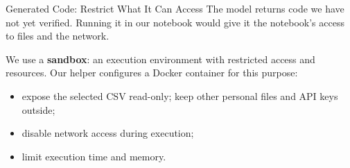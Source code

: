 \documentclass[aspectratio=169]{beamer}
\begin{document}
\begin{frame}{Generated Code: Restrict What It Can Access}
  \small The model returns code we have not yet verified. Running it in our notebook would give it the notebook's access to files and the network.
  \par\vspace{0.4em}
  We use a \textbf{sandbox}: an execution environment with restricted access and resources. Our helper configures a Docker container for this purpose:
  \begin{itemize}
    \item expose the selected CSV read-only; keep other personal files and API keys outside;
    \item disable network access during execution;
    \item limit execution time and memory.
  \end{itemize}
  \begin{center}
  \end{center}
\end{frame}
\end{document}
